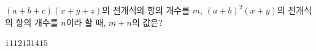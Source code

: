 $(a+b+c)(x+y+z)$의 전개식의 항의 개수를 $m$, $(a+b)^2(x+y)$의 전개식의 항의 개수를 $n$이라 할 때, $m+n$의 값은?
\begin{choices32}{$11$}{$12$}{$13$}{$14$}{$15$}\end{choices32}
